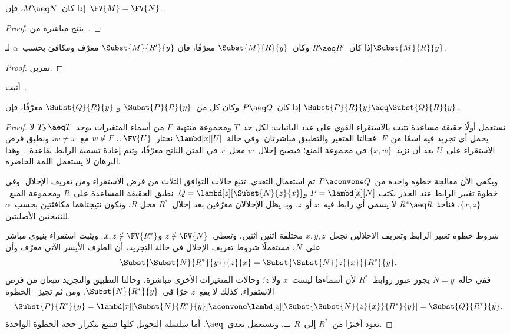 \documentclass[../../../include/open-logic-section]{subfiles}
\begin{document}
\begin{thm}
  إذا كان~$M \aeq N$، فإن~$\FV{M} = \FV{N}$.
\end{thm}

\begin{proof}
  ينتج مباشرة من~.
\end{proof}

\begin{lem}
  إذا كان~$R \aeq R'$ وكان~$\Subst{M}{R}{y}$ معرّفًا، فإن
  $\Subst{M}{R'}{y}$ معرّف ومكافئ بحسب~$\alpha$ لـ$\Subst{M}{R}{y}$.
\end{lem}

\begin{proof}
  تمرين.
\end{proof}

\begin{prob}
  أثبت~.
\end{prob}

\begin{lem}
  إذا كان~$P\aeq Q$ وكان كل من~$\Subst{P}{R}{y}$ و
  $\Subst{Q}{R}{y}$ معرّفًا، فإن
  $\Subst{P}{R}{y}\aeq\Subst{Q}{R}{y}$.
\end{lem}

\begin{proof}
  نستعمل أولًا حقيقة مساعدة تثبت بالاستقراء القوي على عدد البانيات:
  لكل حد~$T$ ومجموعة منتهية~$F$ من أسماء المتغيرات يوجد~$T_F\aeq T$
  لا يحمل أي تجريد فيه اسمًا من~$F$. فحالتا المتغير والتطبيق مباشرتان.
  وفي حالة~$\lambd[x][U]$ نختار~$w\notin F\cup\FV{U}$ مع~$w\ne x$،
  ونطبق فرض الاستقراء على~$U$ بعد أن نزيد~$\{x,w\}$ في مجموعة المنع؛
  فيصبح إحلال~$w$ محل~$x$ في المتن الناتج معرّفًا، وتتم إعادة تسمية
  الرابط بقاعدة~. وهذا البرهان لا يستعمل اللمة
  الحاضرة.

  ويكفي الآن معالجة خطوة واحدة من~$P\aconvone Q$ ثم استعمال التعدي.
  تتبع حالات التوافق الثلاث من فرض الاستقراء ومن تعريف الإحلال.
  وفي خطوة تغيير الرابط عند الجذر نكتب
  $P=\lambd[x][N]$ و$Q=\lambd[z][\Subst{N}{z}{x}]$.
  نطبق الحقيقة المساعدة على~$R$ ومجموعة المنع~$\{x,z\}$، فنأخذ
  $R^\ast\aeq R$ لا يسمى أي رابط فيه~$x$ أو~$z$.
  وبـ يظل الإحلالان معرّفين بعد إحلال~$R^\ast$ محل
  $R$، وتكون نتيجتاهما مكافئتين بحسب~$\alpha$ للنتيجتين الأصليتين.

  شروط خطوة تغيير الرابط وتعريف الإحلالين تجعل~$x,y,z$ مختلفة اثنين
  اثنين، وتعطي~$z\notin\FV{N}$ و$x,z\notin\FV{R^\ast}$.
  ويثبت استقراء بنيوي مباشر على~$N$، مستعملًا شروط تعريف الإحلال في
  حالة التجريد، أن الطرف الأيسر الآتي معرّف وأن
  \[
    \Subst{\Subst{N}{R^\ast}{y}}{z}{x}
    =\Subst{\Subst{N}{z}{x}}{R^\ast}{y}.
  \]
  ففي حالة~$N=y$ يجوز عبور روابط~$R^\ast$ لأن أسماءها ليست~$x$ ولا
  $z$؛ وحالات المتغيرات الأخرى مباشرة، وحالتا التطبيق والتجريد تتبعان
  من فرض الاستقراء. كذلك لا يقع~$z$ حرًا في~$\Subst{N}{R^\ast}{y}$.
  ومن ثم تجيز~ الخطوة
  \[
    \Subst{P}{R^\ast}{y}
    =\lambd[x][\Subst{N}{R^\ast}{y}]
    \aconvone
    \lambd[z][\Subst{\Subst{N}{z}{x}}{R^\ast}{y}]
    =\Subst{Q}{R^\ast}{y}.
  \]
  نعود أخيرًا من~$R^\ast$ إلى~$R$ بــ، ونستعمل
  تعدي~$\aeq$. أما سلسلة التحويل كلها فتتبع بتكرار حجة الخطوة الواحدة.
\end{proof}
\end{document}
